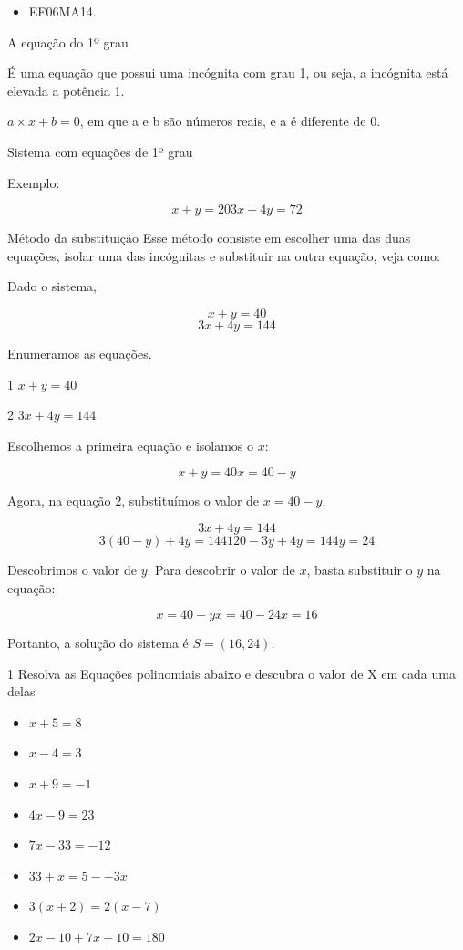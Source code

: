\begin{itemize} 
\item  EF06MA14.
\end{itemize}

A equação do 1º grau~

É uma equação que possui uma incógnita com grau 1, ou seja, a incógnita
está elevada a potência 1.

$a\times x + b = 0$, em que a e b são números reais, e a é diferente de $0$.

Sistema com equações de 1º grau

Exemplo:

$$x + y = 20 3x + 4y = 72$$

Método da substituição Esse método consiste em escolher uma das duas
equações, isolar uma das incógnitas e substituir na outra equação, veja
como:

Dado o sistema,

$$x + y = 40$$
$$3x + 4y = 144$$

Enumeramos as equações.

\num{1}  $x + y = 40$

\num{2}  $3x + 4y = 144$

Escolhemos a primeira equação e isolamos o $x$:

$$x + y = 40 x = 40 - y$$

Agora, na equação $2$, substituímos o valor de $x = 40 - y$.

$$3x + 4y = 144$$ 
$$3 (40 - y) + 4y = 144 120 - 3y + 4y = 144 y = 24$$

Descobrimos o valor de $y$. Para descobrir o valor de $x$, basta substituir
o $y$ na equação:

$$x = 40 - y x = 40 - 24 x = 16$$

Portanto, a solução do sistema é $S = (16, 24)$.





\num{1}  Resolva as Equações polinomiais abaixo e descubra o valor de X em
cada uma delas

\begin{multicols}{2}\baselineskip 
\begin{itemize}\def\labelenumi{\alph{enumi})}
\item $x + 5 = 8$

\item $x − 4 = 3$

\item $x + 9 = −1$

\item $4x − 9 = 23$

\item $7x − 33 = −12$

\item $33+ x = 5 -- 3x$

\item $3(x + 2) = 2 (x - 7)$

\item $2x - 10 + 7x + 10 = 180$
\end{itemize}
\end{multicols}

